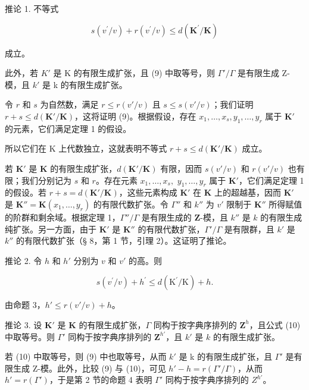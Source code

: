 推论 1. 不等式

\[
s (v ^ {\prime} / v) + r (v ^ {\prime} / v) \leqslant d (\mathbf {K} ^ {\prime} / \mathbf {K})\tag{9}
\]

成立。

此外，若 \(K'\) 是 K 的有限生成扩张，且 (9) 中取等号，则 \(\Gamma'/\Gamma\) 是有限生成 Z-模，且 \(k'\) 是 k 的有限生成扩张。

令 \(r\) 和 \(s\) 为自然数，满足 \(r \leqslant r(v'/v)\) 且 \(s \leqslant s(v'/v)\)；我们证明 \(r + s \leqslant d(\mathbf{K}'/\mathbf{K})\)，这将证明 (9)。根据假设，存在 \(x_1, \ldots, x_s, y_1, \ldots, y_r\) 属于 \(\mathbf{K}'\) 的元素，它们满足定理 1 的假设。

所以它们在 K 上代数独立，这就表明不等式 \(r + s \leqslant d(\mathbf{K}'/\mathbf{K})\) 成立。

若 \(\mathbf{K}'\) 是 \(\mathbf{K}\) 的有限生成扩张，\(d(\mathbf{K}' / \mathbf{K})\) 有限，因而 \(s(v' / v)\) 和 \(r(v' / v)\) 也有限；我们分别记为 \(s\) 和 \(r\)。存在元素 \(x_{1},\ldots ,x_{s},\) \(y_{1},\ldots ,y_{r}\) 属于 \(\mathbf{K}'\)，它们满足定理 1 的假设。若 \(r + s = d(\mathbf{K}' / \mathbf{K})\)，这些元素构成 \(\mathbf{K}'\) 在 \(\mathbf{K}\) 上的超越基，因而 \(\mathbf{K}'\) 是 \(\mathbf{K}'' = \mathbf{K}(x_1,\dots,y_r)\) 的有限代数扩张。令 \(\Gamma''\) 和 \(k''\) 为 \(v'\) 限制于 \(\mathbf{K}''\) 所得赋值的阶群和剩余域。根据定理 1，\(\Gamma'' / \Gamma\) 是有限生成的 \(\mathbf{Z}\)-模，且 \(k''\) 是 \(k\) 的有限生成纯扩张。另一方面，由于 \(\mathbf{K}'\) 是 \(\mathbf{K}''\) 的有限代数扩张，\(\Gamma' / \Gamma\) 是有限群，且 \(k'\) 是 \(k''\) 的有限代数扩张（§ 8，第 1 节，引理 2）。这证明了推论。

推论 2. 令 \(h\) 和 \(h'\) 分别为 \(v\) 和 \(v'\) 的高。则

\[
s (v ^ {\prime} / v) + h ^ {\prime} \leqslant d (\mathrm{K} ^ {\prime} / \mathrm{K}) + h.\tag{10}
\]

由命题 3，\(h' \leqslant r(v'/v) + h\)。

推论 3. 设 \(\mathbf{K}'\) 是 \(\mathbf{K}\) 的有限生成扩张，\(\Gamma\) 同构于按字典序排列的 \(\mathbf{Z}^h\)，且公式 (10) 中取等号。则 \(\Gamma'\) 同构于按字典序排列的 \(\mathbf{Z}^{h'}\)，且 \(k'\) 是 \(k\) 的有限生成扩张。

若 (10) 中取等号，则 (9) 中也取等号，从而 \(k'\) 是 k 的有限生成扩张，且 \(\Gamma'\) 是有限生成 Z-模。此外，比较 (9) 与 (10)，可见 \(h' - h = r(\Gamma'/\Gamma)\)，从而 \(h' = r(\Gamma')\)，于是第 2 节的命题 4 表明 \(\Gamma'\) 同构于按字典序排列的 \(Z^{h'}\)。

